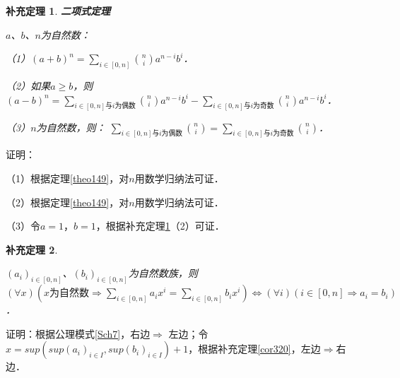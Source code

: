 \documentclass[12pt, a4paper, oneside]{book}
\newtheorem{cor}{补充定理}
\begin{document}
			\begin{cor}\label{cor329}
				\textbf{二项式定理}
				\par
				$a$、$b$、$n$为自然数：
				\par
				（1）$(a+b)^n=\sum\limits_{i\in [0, n]}\binom{n}{i}a^{n-i}b^i$．
				\par
				（2）如果$a\geq b$，则$(a-b)^n=\sum\limits_{i\in[0, n]\text{与}i\text{为偶数}}\binom{n}{i}a^{n-i}b^i-\sum\limits_{i\in[0, n]\text{与}i\text{为奇数}}\binom{n}{i}a^{n-i}b^i$．
				\par
				（3）$n$为自然数，则：
				$\sum\limits_{i\in[0, n]\text{与}i\text{为偶数}}\binom{n}{i}=\sum\limits_{i\in[0, n]\text{与}i\text{为奇数}}\binom{n}{i}$．
				
			\end{cor}
			证明：
			\par
			（1）根据定理\ref{theo149}，对$n$用数学归纳法可证．
			\par
			（2）根据定理\ref{theo149}，对$n$用数学归纳法可证．
			\par
			（3）令$a=1$，$b=1$，根据补充定理\ref{cor329}（2）可证．
			
			\begin{cor}\label{cor330}
				\hfill\par
				$(a_i)_{i\in [0, n]}$、$(b_i)_{i\in [0, n]}$为自然数族，则$(\forall x)(x\text{为自然数}\Rightarrow \sum\limits_{i\in [0, n]}a_ix^i=\sum\limits_{i\in [0, n]}b_ix^i)\Leftrightarrow (\forall i)(i\in [0, n]\Rightarrow a_i=b_i)$．
			\end{cor}
			证明：根据公理模式\ref{Sch7}，右边$\Rightarrow$ 左边；令$x=sup(sup(a_i)_{i\in I}, sup(b_i)_{i\in I})+1$，根据补充定理\ref{cor320}，左边$\Rightarrow$右边．
			
\end{document}
